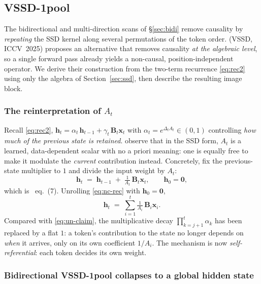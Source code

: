 \documentclass[11pt,a4paper]{article}
\begin{document}
\subsection{\texorpdfstring{VSSD-1pool}{VSSD-1pool}}
\label{sec:ncssd}

The bidirectional and multi-direction scans of \S\ref{sec:bidi}
remove causality by \emph{repeating} the SSD kernel along several
permutations of the token order. \cite{vssd} (VSSD, ICCV~2025)
proposes an alternative that removes causality \emph{at the algebraic
level}, so a single forward pass already yields a non-causal,
position-independent operator. We derive their construction from the
two-term recurrence \eqref{eq:rec2} using only the algebra of
Section~\ref{sec:ssd}, then describe the resulting image block.

\subsubsection{The reinterpretation of \texorpdfstring{$A_t$}{A-t}}

Recall \eqref{eq:rec2}, $\bm{h}_t = \alpha_t\,\bm{h}_{t-1}
+ \gamma_t\,\bm{B}_t\bm{x}_t$ with $\alpha_t = e^{\Delta_t A_t}\in
(0,1)$ controlling \emph{how much of the previous state is retained}.
\cite{vssd} observe that in the SSD form, $A_t$ is a learned,
data-dependent scalar with no a priori meaning: one is equally free to
make it modulate the \emph{current} contribution instead. Concretely,
fix the previous-state multiplier to $1$ and divide the input weight
by $A_t$:
\begin{equation}\label{eq:nc-rec}
  \bm{h}_t \;=\; \bm{h}_{t-1} \;+\; \tfrac{1}{A_t}\,\bm{B}_t\bm{x}_t,
  \qquad \bm{h}_0 = \bm{0},
\end{equation}
which is \cite{vssd}~eq.~(7). Unrolling \eqref{eq:nc-rec} with
$\bm{h}_0=\bm{0}$,
\begin{equation}\label{eq:nc-unroll}
  \bm{h}_t \;=\; \sum_{i=1}^{t} \tfrac{1}{A_i}\,\bm{B}_i\bm{x}_i.
\end{equation}
Compared with \eqref{eq:un-claim}, the multiplicative decay
$\prod_{k=j+1}^{t}\alpha_k$ has been replaced by a flat $1$: a token's
contribution to the state no longer depends on \emph{when} it
arrives, only on its own coefficient $1/A_i$. The mechanism is now
\emph{self-referential}: each token decides its own weight.

\subsubsection{Bidirectional VSSD-1pool collapses to a global hidden state}
\end{document}

